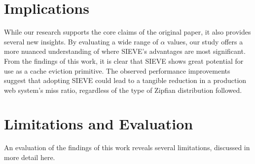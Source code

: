 \section{Implications}\label{discussion:implications}


While our research supports the core claims of the original paper, it also provides several new insights. By evaluating a wide range of $\alpha$ values, our study offers a more nuanced understanding of where SIEVE's advantages are most significant. From the findings of this work, it is clear that SIEVE shows great potential for use as a cache eviction primitive. The observed performance improvements suggest that adopting SIEVE could lead to a tangible reduction in a production web system's miss ratio, regardless of the type of Zipfian distribution followed.

\section{Limitations and Evaluation}\label{discussion:limitations}


An evaluation of the findings of this work reveals several limitations, discussed in more detail here.

